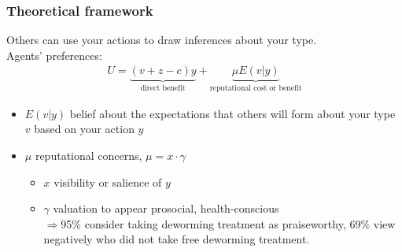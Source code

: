 \documentclass{beamer}
\theoremstyle{plain}
\begin{document}
\begin{frame}[label=slide8]
\frametitle{\large{Theoretical framework}}
\small{
Others can use your actions to draw inferences about your type.} \\
\smallskip
\small{
Agents' preferences:
\begin{align}
U = \underbrace{(v + z - c)y}_{\text{direct benefit}} + \underbrace{\mu E(v|y)}_{\text{reputational cost or benefit}}  \nonumber
\end{align}}
\small{
\begin{itemize}
\item $E(v|y)$ belief about the expectations that others will form about your type $v$ based on your action $y$ 
\item $\mu$ reputational concerns, $\mu= x  \cdot \gamma$
\begin{itemize}
\item $x$ visibility or salience of $y$
\item $\gamma$ valuation to appear prosocial, health-conscious \\
$\Rightarrow$95$\%$ consider taking deworming treatment as praiseworthy, $69\%$ view negatively who did not take free deworming treatment.
\end{itemize}
\end{itemize}}
\end{frame}
\end{document}
